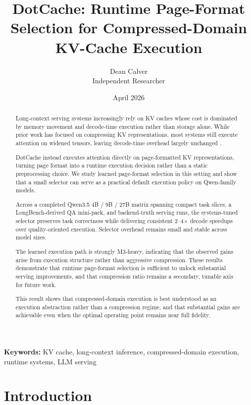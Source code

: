 \documentclass[11pt]{article}
\title{
DotCache: Runtime Page-Format Selection for Compressed-Domain KV-Cache Execution
}
\author{
Dean Calver \\
Independent Researcher
}
\date{April 2026}
\begin{document}
\maketitle

\noindent\textbf{Keywords:} KV cache, long-context inference, compressed-domain execution, runtime systems, LLM serving

\begin{abstract}

Long-context serving systems increasingly rely on KV caches whose cost is dominated by memory movement and decode-time execution rather than storage alone. While prior work has focused on compressing KV representations, most systems still execute attention on widened tensors, leaving decode-time overhead largely unchanged \cite{kvquant,kivi,qserve,innerq,llm_kv_survey}.

DotCache instead executes attention directly on page-formatted KV representations, turning page format into a runtime execution decision rather than a static preprocessing choice. We study learned page-format selection in this setting and show that a small selector can serve as a practical default execution policy on Qwen-family models.

Across a completed Qwen3.5 4B / 9B / 27B matrix spanning compact task slices, a LongBench-derived QA mini-pack, and backend-truth serving runs, the systems-tuned selector preserves task correctness while delivering consistent 2--4$\times$ decode speedups over quality-oriented execution. Selector overhead remains small and stable across model sizes.

The learned execution path is strongly M3-heavy, indicating that the observed gains arise from execution structure rather than aggressive compression. These results demonstrate that runtime page-format selection is sufficient to unlock substantial serving improvements, and that compression ratio remains a secondary, tunable axis for future work.

This result shows that compressed-domain execution is best understood as an execution abstraction rather than a compression regime, and that substantial gains are achievable even when the optimal operating point remains near full fidelity.

\end{abstract}

\section{Introduction}
\end{document}
